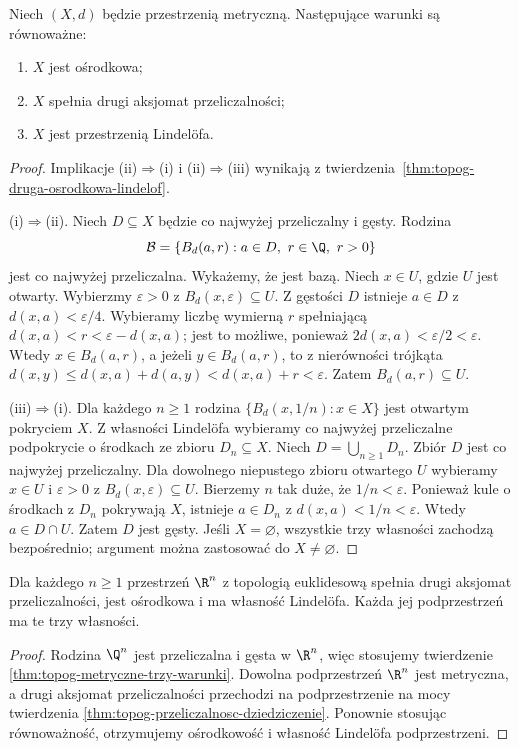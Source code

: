 \begin{twierdzenie}
\label{thm:topog-metryczne-trzy-warunki}
Niech $(X,d)$ będzie przestrzenią metryczną.
Następujące warunki są równoważne:
\begin{enumerate}[label=(\roman*)]
\item $X$ jest ośrodkowa;
\item $X$ spełnia drugi aksjomat przeliczalności;
\item $X$ jest przestrzenią Lindelöfa.
\end{enumerate}
\end{twierdzenie}
\begin{proof}
Implikacje (ii)$\Rightarrow$(i) i (ii)$\Rightarrow$(iii)
wynikają z twierdzenia~\ref{thm:topog-druga-osrodkowa-lindelof}.

(i)$\Rightarrow$(ii). Niech $D\subseteq X$ będzie
co najwyżej przeliczalny i gęsty. Rodzina
\[
 \mathcal B=\{B_d(a,r):a\in D,\ r\in\Q,\ r>0\}
\]
jest co najwyżej przeliczalna. Wykażemy, że jest bazą.
Niech $x\in U$, gdzie $U$ jest otwarty. Wybierzmy
$\varepsilon>0$ z $B_d(x,\varepsilon)\subseteq U$.
Z gęstości $D$ istnieje $a\in D$ z
$d(x,a)<\varepsilon/4$. Wybieramy liczbę wymierną
$r$ spełniającą
$d(x,a)<r<\varepsilon-d(x,a)$; jest to możliwe,
ponieważ $2d(x,a)<\varepsilon/2<\varepsilon$.
Wtedy $x\in B_d(a,r)$, a jeżeli $y\in B_d(a,r)$,
to z nierówności trójkąta
$d(x,y)\leq d(x,a)+d(a,y)<d(x,a)+r<\varepsilon$.
Zatem $B_d(a,r)\subseteq U$.

(iii)$\Rightarrow$(i). Dla każdego $n\geq1$ rodzina
$\{B_d(x,1/n):x\in X\}$ jest otwartym pokryciem $X$.
Z własności Lindelöfa wybieramy co najwyżej przeliczalne
podpokrycie o środkach ze zbioru $D_n\subseteq X$.
Niech $D=\bigcup_{n\geq1}D_n$. Zbiór $D$ jest
co najwyżej przeliczalny. Dla dowolnego niepustego
zbioru otwartego $U$ wybieramy $x\in U$ i
$\varepsilon>0$ z $B_d(x,\varepsilon)\subseteq U$.
Bierzemy $n$ tak duże, że $1/n<\varepsilon$.
Ponieważ kule o środkach z $D_n$ pokrywają $X$,
istnieje $a\in D_n$ z $d(x,a)<1/n<\varepsilon$.
Wtedy $a\in D\cap U$. Zatem $D$ jest gęsty.
Jeśli $X=\varnothing$, wszystkie trzy własności
zachodzą bezpośrednio; argument można zastosować do
$X\ne\varnothing$.
\end{proof}

\begin{wniosek}
\label{cor:topog-osrodkowa-metryczna-baza}
Dla każdego $n\geq1$ przestrzeń $\R^n$ z topologią
euklidesową spełnia drugi aksjomat przeliczalności,
jest ośrodkowa i ma
własność Lindelöfa. Każda jej podprzestrzeń ma te
trzy własności.
\end{wniosek}
\begin{proof}
Rodzina $\Q^n$ jest przeliczalna i gęsta w $\R^n$,
więc stosujemy twierdzenie
\ref{thm:topog-metryczne-trzy-warunki}. Dowolna podprzestrzeń
$\R^n$ jest metryczna, a drugi aksjomat przeliczalności
przechodzi na podprzestrzenie na mocy twierdzenia
\ref{thm:topog-przeliczalnosc-dziedziczenie}.
Ponownie stosując równoważność, otrzymujemy ośrodkowość
i własność Lindelöfa podprzestrzeni.
\end{proof}

